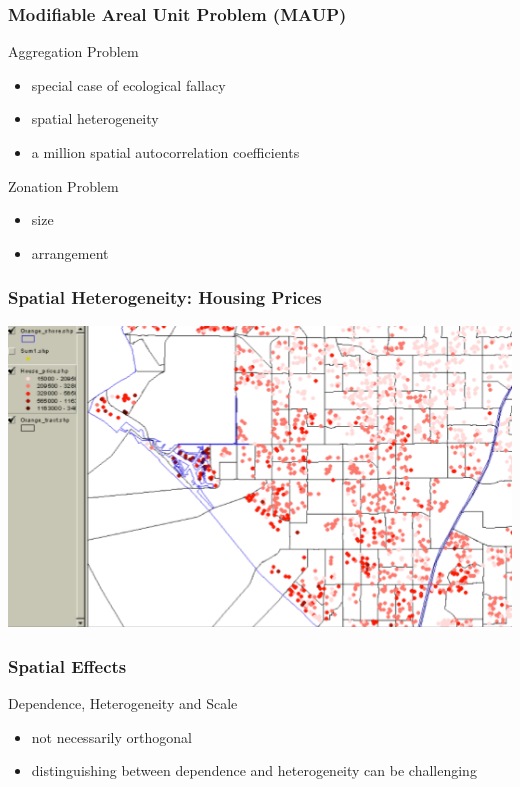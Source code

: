 \documentclass[nototal,handout]{beamer}
\begin{document}
  \begin{frame}
    \frametitle{Modifiable Areal Unit Problem (MAUP)}
    \begin{block}{Aggregation Problem}
      \begin{itemize}
	\item special case of ecological fallacy
	\item spatial heterogeneity
	\item a million spatial autocorrelation coefficients
      \end{itemize}
    \end{block}
    \begin{block}{Zonation Problem}
      \begin{itemize}
	\item size
	\item arrangement
      \end{itemize}
    \end{block}
  \end{frame}
  \begin{frame}
    \frametitle{Spatial Heterogeneity: Housing Prices}
    \begin{center}
      \includegraphics[width=.65\linewidth]{ochousing.png}
    \end{center}
  \end{frame}

  \begin{frame}
    \frametitle{Spatial Effects}
    \begin{block}{Dependence, Heterogeneity and Scale}
      \begin{itemize}
	\item not necessarily orthogonal
	\item distinguishing between dependence and heterogeneity can be
	  challenging
      \end{itemize}
     \end{block}
   \end{frame}
\end{document}
